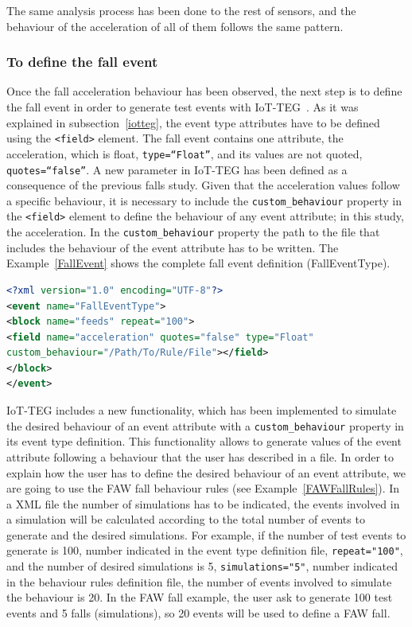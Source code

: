 \documentclass[review]{elsarticle}
\begin{document}
The same analysis process has been done to the rest of sensors, and the behaviour of the acceleration of all of 
them follows the same pattern.

\subsubsection*{To define the fall event} Once the fall acceleration behaviour has been observed, the next step is to define the 
fall event in order to generate test events with IoT-TEG~\cite{TesisGutierrez2017,Gutierrez2017}. As it was explained in 
subsection~\ref{iotteg}, the event type attributes have
to be defined using the \texttt{<field>} element. The fall event contains one attribute, the acceleration, which is float, 
\texttt{type=``Float''}, and its values are not quoted, \texttt{quotes=``false''}. A new parameter in IoT-TEG has been defined as a 
consequence of the previous falls study. Given that the acceleration values follow a specific behaviour, it is necessary to include 
the \texttt{custom\_behaviour} property in the \texttt{<field>} element to define the behaviour of any event attribute; 
in this study, the acceleration. In the \texttt{custom\_behaviour} property the path to the file that includes the behaviour of the 
event attribute has to be written. The Example~\ref{FallEvent} shows the complete fall event definition (FallEventType).

\begin{lstlisting}[basicstyle=\ttfamily\footnotesize,language=XML,caption={Fall event type definition},label=FallEvent]
<?xml version="1.0" encoding="UTF-8"?>
<event name="FallEventType">
<block name="feeds" repeat="100">
<field name="acceleration" quotes="false" type="Float" 
custom_behaviour="/Path/To/Rule/File"></field>
</block>
</event>
\end{lstlisting}

IoT-TEG includes a new functionality, which has been implemented to simulate the desired behaviour of an 
event attribute with a \texttt{custom\_behaviour} property in its event type definition. This functionality 
allows to generate values of the event attribute following a behaviour that the user has described in a file.
In order to explain how the user has to define the desired behaviour of an event attribute, we are going
to use the FAW fall behaviour rules (see Example~\ref{FAWFallRules}). In a XML file the number of simulations has to be
indicated, the events involved in a simulation will be calculated according to the total number of events
to generate and the desired simulations. For example, if the number of test events to generate is 100, 
number indicated in the event type definition file, \texttt{repeat="100"}, and the number of desired 
simulations is 5, \texttt{simulations="5"}, number indicated in the behaviour rules definition file, 
the number of events involved to simulate the behaviour is 20. In the FAW fall example, the user ask to 
generate 100 test events and 5 falls (simulations), so 20 events will be used to define a FAW fall.
\end{document}
